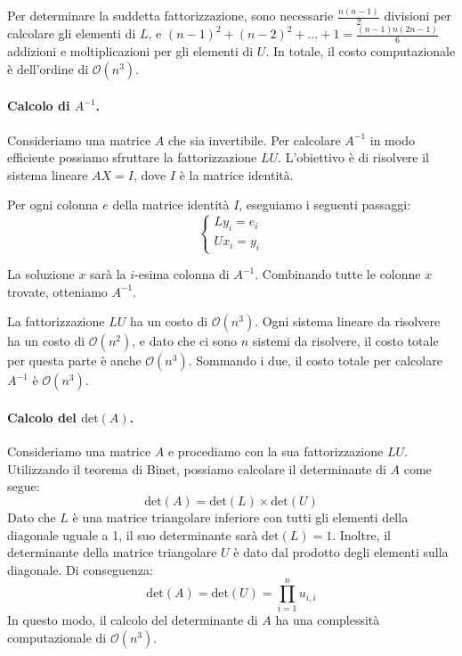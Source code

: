 \documentclass{article}
\begin{document}
Per determinare la suddetta fattorizzazione, sono necessarie $\frac{n(n-1)}{2}$
divisioni per calcolare gli elementi di $L$, e
$(n-1)^2+(n-2)^2+\ldots+1=\frac{(n-1)n(2n-1)}{6}$ addizioni e moltiplicazioni
per gli elementi di $U$. In totale, il costo computazionale è dell'ordine di
$\mathcal{O}(n^3)$.
\paragraph{Calcolo di $A^{-1}$.} Consideriamo una matrice $A$ che sia
invertibile. Per calcolare $A^{-1}$
in modo efficiente possiamo sfruttare la fattorizzazione $LU$. L'obiettivo è
di risolvere il sistema lineare $AX=I$, dove $I$ è la matrice identità.

Per ogni colonna $e$ della matrice identità $I$, eseguiamo i seguenti
passaggi:
$$\begin{cases}
   Ly_i=e_i \\ 
   Ux_i=y_i
\end{cases}$$

La soluzione $x$ sarà la $i$-esima colonna di $A^{-1}$. Combinando tutte le
colonne $x$ trovate, otteniamo $A^{-1}$.

La fattorizzazione $LU$ ha un costo di $\mathcal{O}(n^3)$. Ogni sistema
lineare da risolvere ha un costo di $\mathcal{O}(n^2)$, e dato che ci sono $n$
sistemi da risolvere, il costo totale per questa parte è anche
$\mathcal{O}(n^3)$. Sommando i due, il costo totale per calcolare $A^{-1}$ è
$\mathcal{O}(n^3)$.
\paragraph{Calcolo del $\text{det}(A)$.}
Consideriamo una matrice $A$ e procediamo con la sua fattorizzazione $LU$.
Utilizzando il teorema di Binet, possiamo calcolare il determinante di $A$
come segue:
$$\text{det}(A)=\text{det}(L)\times \text{det}(U)$$
Dato che $L$ è una matrice triangolare inferiore con tutti gli elementi della
diagonale uguale a 1, il suo determinante sarà $\text{det}(L)=1$. Inoltre, il
determinante della matrice triangolare $U$ è dato dal prodotto degli
elementi sulla diagonale. Di conseguenza:
$$\text{det}(A)=\text{det}(U)=\prod_{i=1}^{n}u_{i,i}$$
In questo modo, il calcolo del determinante di $A$ ha una complessità
computazionale di $\mathcal{O}(n^3)$.
\end{document}
